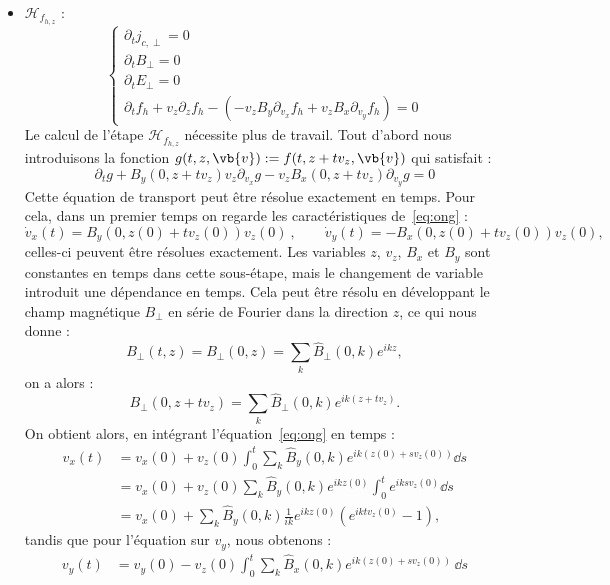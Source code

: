 \begin{itemize}
  \item $\mathcal{H}_{f_{h,z}}$ :
    $$
      \begin{cases}
        \partial_t j_{c,\perp} = 0 \\
        \partial_t B_{\perp} = 0 \\
        \partial_t E_{\perp} = 0 \\
        \partial_t f_h + v_z\partial_{z}f_h - (-v_zB_y\partial_{v_x}f_h + v_zB_x\partial_{v_y}f_h) = 0
      \end{cases}
    $$
    Le calcul de l'étape $\mathcal{H}_{f_{h,z}}$ nécessite plus de travail. Tout d'abord nous introduisons la fonction $g(t,z,\vb{v}) := f(t,z+tv_z,\vb{v})$ qui satisfait :
    \begin{equation}
      \label{eq:ong}
      \partial_t g + B_y(0,z+tv_z)v_z\partial_{v_x}g - v_zB_x(0,z+tv_z)\partial_{v_y}g = 0
    \end{equation}
    Cette équation de transport peut être résolue exactement en temps. Pour cela, dans un premier temps on regarde les caractéristiques de~\eqref{eq:ong} :
    \begin{equation}
      \dot{v}_x(t) = B_y(0,z(0)+tv_z(0))v_z(0)\ ,\qquad \dot{v}_y(t) = -B_x(0,z(0)+tv_z(0))v_z(0),
    \end{equation}
    celles-ci peuvent être résolues exactement. Les variables $z$, $v_z$, $B_x$ et $B_y$ sont constantes en temps dans cette sous-étape, mais le changement de variable introduit une dépendance en temps. Cela peut être résolu en développant le champ magnétique $B_{\perp}$ en série de Fourier dans la direction $z$, ce qui nous donne :
    $$
      B_{\perp}(t,z) = B_\perp(0,z) = \sum_k \hat{B}_\perp(0,k)e^{ikz},
    $$
    on a alors :
    $$
      B_\perp(0,z+tv_z) = \sum_k\hat{B}_\perp(0,k)e^{ik(z+tv_z)}.
    $$
    On obtient alors, en intégrant l'équation~\eqref{eq:ong} en temps :
    $$
      \begin{aligned}
        v_x(t)  &= v_x(0) + v_z(0) \int_0^t \sum_k \hat{B}_{y}(0, k) e^{ik (z(0)+sv_z(0))} \dd{s}  \\
                &= v_x(0) + v_z(0)  \sum_k \hat{B}_{y}(0, k) e^{ik z(0)} \int_0^t e^{ik s v_z(0)} \dd{s} \\
                &= v_x(0) + \sum_k \hat{B}_{y}(0, k) \frac{1}{ik} e^{ik z(0)} (e^{ikt v_z(0)} -1),
      \end{aligned}
    $$
    tandis que pour l'équation sur $v_y$, nous obtenons :
    $$
      \begin{aligned}
        v_y(t) &= v_y(0) - v_z(0) \int_0^t \sum_k \hat{B}_{x}(0, k) e^{ik (z(0) + s v_z(0))}\,\dd{s} \\

\end{aligned}$$
\end{itemize}
